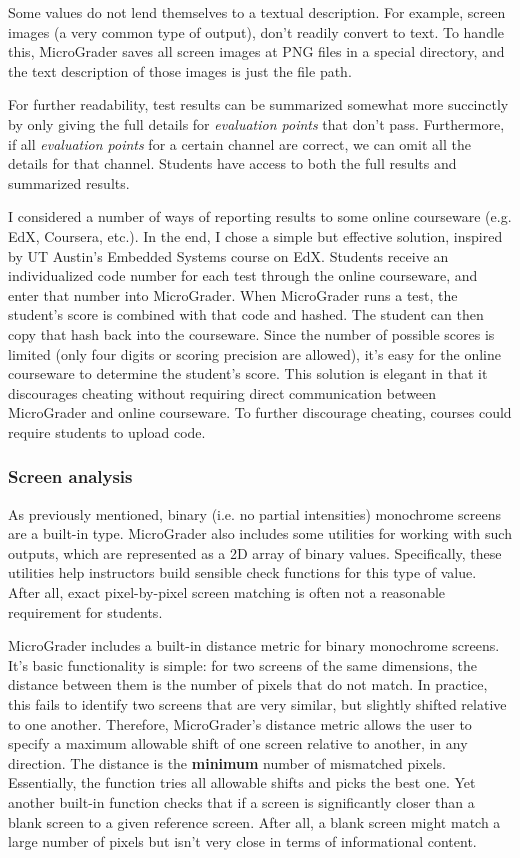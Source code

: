 \documentclass[12pt]{article}
\begin{document}
Some values do not lend themselves to a textual description.  For example, screen images (a very common type of output), don't readily convert to text.  To handle this, MicroGrader saves all screen images at PNG files in a special directory, and the text description of those images is just the file path.

For further readability, test results can be summarized somewhat more succinctly by only giving the full details for \textit{evaluation points} that don't pass.  Furthermore, if all \textit{evaluation points} for a certain channel are correct, we can omit all the details for that channel.  Students have access to both the full results and summarized results.

I considered a number of ways of reporting results to some online courseware (e.g. EdX, Coursera, etc.).  In the end, I chose a simple but effective solution, inspired by UT Austin's Embedded Systems course on EdX.  Students receive an individualized code number for each test through the online courseware, and enter that number into MicroGrader.  When MicroGrader runs a test, the student's score is combined with that code and hashed.  The student can then copy that hash back into the courseware.  Since the number of possible scores is limited (only four digits or scoring precision are allowed), it's easy for the online courseware to determine the student's score.  This solution is elegant in that it discourages cheating without requiring direct communication between MicroGrader and online courseware.  To further discourage cheating, courses could require students to upload code.

\subsubsection{Screen analysis}
As previously mentioned, binary (i.e. no partial intensities) monochrome screens are a built-in type.  MicroGrader also includes some utilities for working with such outputs, which are represented as a 2D array of binary values.  Specifically, these utilities help instructors build sensible check functions for this type of value.  After all, exact pixel-by-pixel screen matching is often not a reasonable requirement for students.

MicroGrader includes a built-in distance metric for binary monochrome screens.  It's basic functionality is simple: for two screens of the same dimensions, the distance between them is the number of pixels that do not match.  In practice, this fails to identify two screens that are very similar, but slightly shifted relative to one another.  Therefore, MicroGrader's distance metric allows the user to specify a maximum allowable shift of one screen relative to another, in any direction.  The distance is the \textbf{minimum} number of mismatched pixels.  Essentially, the function tries all allowable shifts and picks the best one.  Yet another built-in function checks that if a screen is significantly closer than a blank screen to a given reference screen.  After all, a blank screen might match a large number of pixels but isn't very close in terms of informational content.
\end{document}
